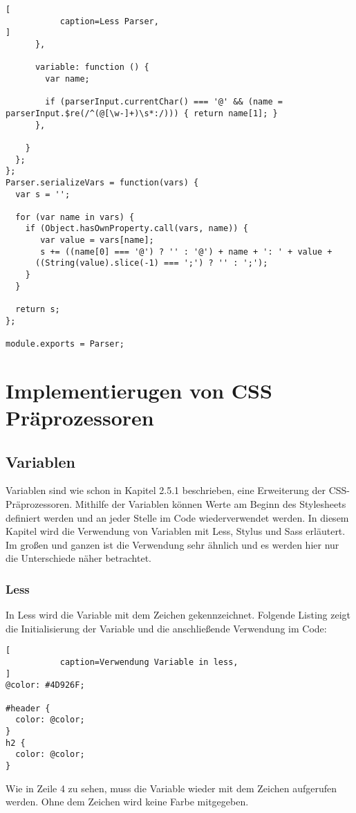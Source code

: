 \begin{lstlisting}[
           caption=Less Parser,
]
      },

      variable: function () {
        var name;

        if (parserInput.currentChar() === '@' && (name = parserInput.$re(/^(@[\w-]+)\s*:/))) { return name[1]; }
      },

    }
  };
};
Parser.serializeVars = function(vars) {
  var s = '';

  for (var name in vars) {
    if (Object.hasOwnProperty.call(vars, name)) {
       var value = vars[name];
       s += ((name[0] === '@') ? '' : '@') + name + ': ' + value +
      ((String(value).slice(-1) === ';') ? '' : ';');
    }
  }

  return s;
};

module.exports = Parser;
\end{lstlisting}
\newpage


\section{Implementierugen von CSS Präprozessoren}
\subsection{Variablen}
Variablen sind wie schon in Kapitel 2.5.1 beschrieben, eine Erweiterung der CSS-Präprozessoren. Mithilfe der Variablen können Werte am Beginn des Stylesheets definiert werden und an jeder Stelle im Code wiederverwendet werden. In diesem Kapitel wird die Verwendung von Variablen mit Less, Stylus und Sass erläutert. Im großen und ganzen ist die Verwendung sehr ähnlich und es werden hier nur die Unterschiede näher betrachtet.
\subsubsection{Less}
In Less wird die Variable mit dem Zeichen \glqq{} gekennzeichnet. Folgende Listing zeigt die Initialisierung der Variable und die anschließende Verwendung im Code:
\begin{lstlisting}[
           caption=Verwendung Variable in less,
]
@color: #4D926F;

#header {
  color: @color;
}
h2 {
  color: @color;
}
\end{lstlisting}
Wie in Zeile 4 zu sehen, muss die Variable wieder mit dem \glqq{} Zeichen aufgerufen werden. Ohne dem  \glqq{} Zeichen wird keine Farbe mitgegeben.

